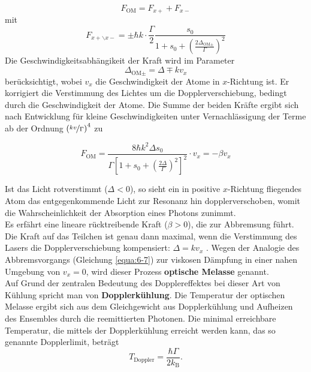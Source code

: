 \documentclass[
class=book,
accentcolor=1b,
custommargins=geometry,
fontsize=11pt,
thesis={type=Versuchsanleitung},
ruledheaders=all,
headline=false,
instbox=false,
marginpar=false,
title=small,
ignore-missing-data=true,
twoside=false,
logofile=apqdesign/tuda_logo.pdf,
pdfa=false %
]{apqpub}
\begin{document}
				\begin{equation}
				F_{\text{OM}} = F_{x+} + F_{x-}
				\end{equation}			
				mit
				\begin{equation}\label{equa:6-5}
				F_{x+\backslash x-} = \pm \hbar k \cdot \frac{\Gamma}{2} \frac{s_0}{1+s_0+\left(\frac{2\Delta_{{\text{OM}}\pm}}{\Gamma}\right)^2} 
				\end{equation}
				Die Geschwindigkeitsabhängikeit der Kraft wird im Parameter			
				\begin{equation}
				\Delta_{\text{OM}\pm} = \Delta \mp k v_{x}
				\end{equation}
				berücksichtigt, wobei $v_x$ die Geschwindigkeit der Atome in $x$-Richtung ist. 
				Er korrigiert die Verstimmung des Lichtes um die Dopplerverschiebung, bedingt durch die Geschwindigkeit der Atome. 
				Die Summe der beiden Kräfte ergibt sich nach Entwicklung für kleine Geschwindigkeiten unter Vernachlässigung der Terme ab der Ordnung $\left(\nicefrac{kv}{\Gamma}\right)^4$ zu
				
				\begin{equation}\label{equa:6-7}
				F_{\text{OM}} = \frac{8 \hbar k^2 \Delta s_0}{\Gamma \left[1+s_0 + \left(\frac{2\Delta}{\Gamma}\right)^2\right]^2} \cdot v_x = -\beta v_x
				\end{equation}
				
				Ist das Licht rotverstimmt ($\Delta < 0$), so sieht ein in positive $x$-Richtung fliegendes Atom das entgegenkommende Licht zur Resonanz hin dopplerverschoben, womit die Wahrscheinlichkeit der Absorption eines Photons zunimmt.\\
				Es erfährt eine lineare rücktreibende Kraft ($\beta > 0$), die zur Abbremsung führt. 
				Die Kraft auf das Teilchen ist genau dann maximal, wenn die Verstimmung des Lasers die Dopplerverschiebung kompensiert: $\Delta = k v_x$ .
				Wegen der Analogie des Abbremsvorgangs (Gleichung \eqref{equa:6-7}) zur viskosen Dämpfung in einer nahen Umgebung von $v_x = 0$, wird dieser Prozess \textbf{optische Melasse} genannt. \\
				Auf Grund der zentralen Bedeutung des Dopplereffektes bei dieser Art von Kühlung spricht man von \textbf{Dopplerkühlung}. 
				Die Temperatur der optischen Melasse ergibt sich aus dem Gleichgewicht aus Dopplerkühlung und Aufheizen des Ensembles durch die reemittierten Photonen.
				Die minimal erreichbare Temperatur, die mittels der Dopplerkühlung erreicht werden kann, das so genannte Dopplerlimit, beträgt				
				\begin{equation}
				T_{\text{Doppler}} = \frac{\hbar \Gamma}{2 k_{\text{B}}}.
				\end{equation}
				
\end{document}
